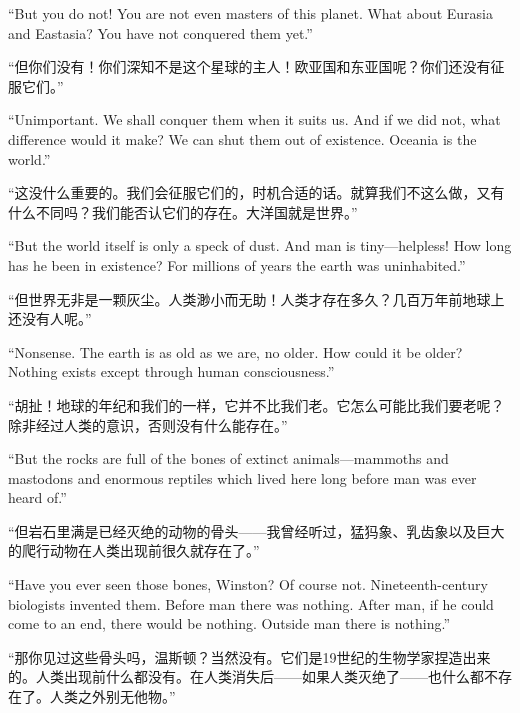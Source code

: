 \begin{paracol}{2}
``But you do not! You are not even masters of this planet. What about
Eurasia and Eastasia? You have not conquered them yet.''

\switchcolumn

``但你们没有！你们深知不是这个星球的主人！欧亚国和东亚国呢？你们还没有征服它们。''

\switchcolumn*

``Unimportant. We shall conquer them when it suits us. And if we did not,
what difference would it make? We can shut them out of existence.
Oceania is the world.''

\switchcolumn

``这没什么重要的。我们会征服它们的，时机合适的话。就算我们不这么做，又有什么不同吗？我们能否认它们的存在。大洋国就是世界。''

\switchcolumn*

``But the world itself is only a speck of dust. And man is
tiny---helpless! How long has he been in existence? For millions of
years the earth was uninhabited.''

\switchcolumn

``但世界无非是一颗灰尘。人类渺小而无助！人类才存在多久？几百万年前地球上还没有人呢。''

\switchcolumn*

``Nonsense. The earth is as old as we are, no older. How could it be
older? Nothing exists except through human consciousness.''

\switchcolumn

``胡扯！地球的年纪和我们的一样，它并不比我们老。它怎么可能比我们要老呢？除非经过人类的意识，否则没有什么能存在。''

\switchcolumn*

``But the rocks are full of the bones of extinct animals---mammoths and
mastodons and enormous reptiles which lived here long before man was
ever heard of.''

\switchcolumn

``但岩石里满是已经灭绝的动物的骨头——我曾经听过，猛犸象、乳齿象以及巨大的爬行动物在人类出现前很久就存在了。''

\switchcolumn*

``Have you ever seen those bones, Winston? Of course not.
Nineteenth-century biologists invented them. Before man there was
nothing. After man, if he could come to an end, there would be nothing.
Outside man there is nothing.''

\switchcolumn

``那你见过这些骨头吗，温斯顿？当然没有。它们是19世纪的生物学家捏造出来的。人类出现前什么都没有。在人类消失后——如果人类灭绝了——也什么都不存在了。人类之外别无他物。''


\end{paracol}
